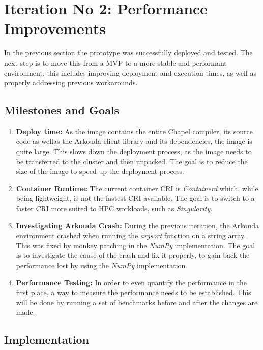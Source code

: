 \section{Iteration No 2: Performance Improvements}
\label{sec:iteration_no2}

In the previous section the prototype was successfully deployed and tested.
The next step is to move this from a \ac{MVP} to a more stable and performant environment,
this includes improving deployment and execution times,
as well as properly addressing previous workarounds.

\subsection{Milestones and Goals}

\begin{enumerate}
    \item \textbf{Deploy time:} As the image contains the entire Chapel compiler, its source code as wellas
          the Arkouda client library and its dependencies, the image is quite large. This slows down the deployment
          process, as the image needs to be transferred to the cluster and then unpacked. The goal is to reduce the
          size of the image to speed up the deployment process.
    \item \textbf{Container Runtime:} The current container \ac{CRI} is \textit{Containerd} which, while being
          lightweight, is not the fastest \ac{CRI} available. The goal is to switch to a faster \ac{CRI} more suited to
          \ac{HPC} workloads, such as \textit{Singularity}.
    \item \textbf{Investigating Arkouda Crash:} During the previous iteration, the Arkouda environment crashed
          when running the \textit{argsort} function on a string array. This was fixed by \gls{monkey patching} in the
          \textit{NumPy} implementation. The goal is to investigate the cause of the crash and fix it properly, to
          gain back the performance lost by using the \textit{NumPy} implementation.
    \item \textbf{Performance Testing:} In order to even quantify the performance in the first place,
          a way to measure the performance needs to be established. This will be done by running a set of benchmarks
          before and after the changes are made.
\end{enumerate}

\subsection{Implementation}

